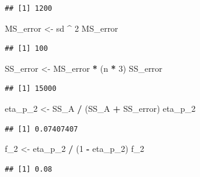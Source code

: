\documentclass[
]{book}
\newenvironment{Shaded}{\begin{snugshade}}{\end{snugshade}}
\newcommand{\DecValTok}[1]{\textcolor[rgb]{0.00,0.00,0.81}{#1}}
\newcommand{\NormalTok}[1]{#1}
\newcommand{\OperatorTok}[1]{\textcolor[rgb]{0.81,0.36,0.00}{\textbf{#1}}}
\newcommand{\StringTok}[1]{\textcolor[rgb]{0.31,0.60,0.02}{#1}}
\begin{document}
\begin{verbatim}
## [1] 1200
\end{verbatim}

\begin{Shaded}
\begin{Highlighting}[]
\NormalTok{MS_error <-}\StringTok{ }\NormalTok{sd }\OperatorTok{^}\StringTok{ }\DecValTok{2}
\NormalTok{MS_error}
\end{Highlighting}
\end{Shaded}

\begin{verbatim}
## [1] 100
\end{verbatim}

\begin{Shaded}
\begin{Highlighting}[]
\NormalTok{SS_error <-}\StringTok{ }\NormalTok{MS_error }\OperatorTok{*}\StringTok{ }\NormalTok{(n }\OperatorTok{*}\StringTok{ }\DecValTok{3}\NormalTok{)}
\NormalTok{SS_error}
\end{Highlighting}
\end{Shaded}

\begin{verbatim}
## [1] 15000
\end{verbatim}

\begin{Shaded}
\begin{Highlighting}[]
\NormalTok{eta_p_}\DecValTok{2}\NormalTok{ <-}\StringTok{ }\NormalTok{SS_A }\OperatorTok{/}\StringTok{ }\NormalTok{(SS_A }\OperatorTok{+}\StringTok{ }\NormalTok{SS_error)}
\NormalTok{eta_p_}\DecValTok{2}
\end{Highlighting}
\end{Shaded}

\begin{verbatim}
## [1] 0.07407407
\end{verbatim}

\begin{Shaded}
\begin{Highlighting}[]
\NormalTok{f_}\DecValTok{2}\NormalTok{ <-}\StringTok{ }\NormalTok{eta_p_}\DecValTok{2} \OperatorTok{/}\StringTok{ }\NormalTok{(}\DecValTok{1} \OperatorTok{-}\StringTok{ }\NormalTok{eta_p_}\DecValTok{2}\NormalTok{)}
\NormalTok{f_}\DecValTok{2}
\end{Highlighting}
\end{Shaded}

\begin{verbatim}
## [1] 0.08
\end{verbatim}
\end{document}
